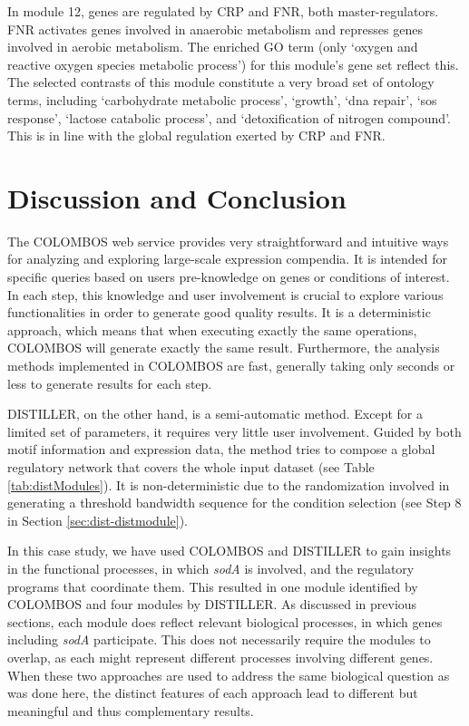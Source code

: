In module 12, genes are regulated by CRP and FNR, both master-regulators.  FNR activates genes involved in anaerobic metabolism and represses genes involved in aerobic metabolism.  The enriched GO term (only `oxygen and reactive oxygen species metabolic process') for this module's gene set reflect this. The selected contrasts of this module constitute a very broad set of ontology terms, including `carbohydrate metabolic process', `growth', `dna repair', `sos response', `lactose catabolic process', and `detoxification of nitrogen compound'.  This is in line with the global regulation exerted by CRP and FNR.


\section{Discussion and Conclusion}

The COLOMBOS web service provides very straightforward and intuitive ways for analyzing and exploring large-scale expression compendia. It is intended for specific queries based on users pre-knowledge on genes or conditions of interest. In each step, this knowledge and user involvement is crucial to explore various functionalities in order to generate good quality results.  It is a deterministic approach, which means that when executing exactly the same operations, COLOMBOS will generate exactly the same result. Furthermore, the analysis methods implemented in COLOMBOS are fast, generally taking only seconds or less to generate results for each step.

DISTILLER, on the other hand, is a semi-automatic method. Except for a limited set of parameters, it requires very little user involvement. Guided by both motif information and expression data, the method tries to compose a global regulatory network that covers the whole input dataset (see Table \ref{tab:distModules}). It is non-deterministic due to the randomization involved in generating a threshold bandwidth sequence for the condition selection (see Step 8 in Section \ref{sec:dist-distmodule}).

In this case study, we have used COLOMBOS and DISTILLER to gain insights in the functional processes, in which \textit{sodA} is involved, and the regulatory programs that coordinate them. This resulted in one module identified by COLOMBOS and four modules by DISTILLER.  As discussed in previous sections, each module does reflect relevant biological processes, in which genes including \textit{sodA} participate.  This does not necessarily require the modules to overlap, as each might represent different processes involving different genes.  When these two approaches are used to address the same biological question as was done here, the distinct features of each approach lead to different but meaningful and thus complementary results.

